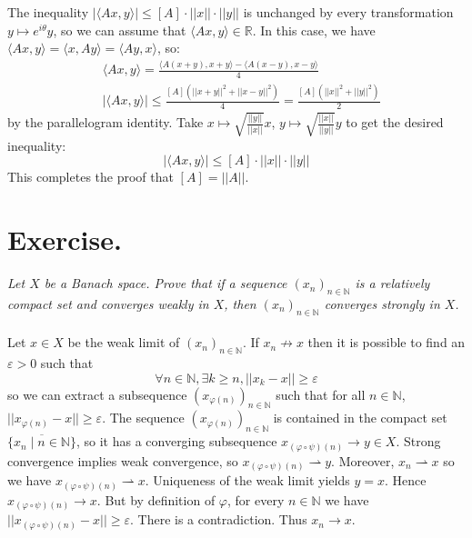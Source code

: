 \documentclass[11pt,a4paper]{article}
\newcommand{\ph}{\varphi}
\newcommand{\il}{\textit}
\newcommand{\N}{\mathbb{N}}
\newcommand{\R}{\mathbb{R}}
\newcommand{\1}{\mathbbm{1}}
\begin{document}
The inequality $|\langle Ax , y \rangle| \leq [A] \cdot ||x|| \cdot ||y||$ is unchanged by every transformation $y \mapsto e^{i\theta} y$, so we can assume that $\langle Ax , y \rangle \in \R$. In this case, we have $\langle Ax , y \rangle = \langle x , Ay \rangle = \langle Ay , x \rangle$, so:
\begin{align*} & \langle Ax , y \rangle = \frac{\langle A(x+y) , x+y \rangle - \langle A(x-y) , x-y \rangle}{4} \\
& |\langle Ax , y \rangle| \leq \frac{[A]\left(||x+y||^2 + ||x-y||^2 \right)}{4} = \frac{[A]\left(||x||^2 + ||y||^2 \right)}{2}
\end{align*}
by the parallelogram identity. Take $x \mapsto \sqrt{\frac{||y||}{||x||}} x$, $y \mapsto \sqrt{\frac{||x||}{||y||}} y$ to get the  desired inequality:
\[ |\langle Ax , y \rangle| \leq [A] \cdot ||x|| \cdot ||y|| \]
This completes the proof that $[A] = ||A||$.
\newpage
\section*{Exercise.}
\il{Let $X$ be a Banach space. Prove that if a sequence $(x_n)_{n\in\N}$ is a relatively compact set and converges weakly in $X$, then $(x_n)_{n\in\N}$ converges strongly in $X$.}\\\\
Let $x \in X$ be the weak limit of $(x_n)_{n\in\N}$. If $x_n \not\to x$ then it is possible to find an $\varepsilon > 0$ such that
\[ \forall n \in \N , \exists k \geq n , ||x_k-x|| \geq \varepsilon \]
so we can extract a subsequence $(x_{\ph(n)})_{n\in\N}$ such that for all $n \in \N$, $||x_{\ph(n)} - x|| \geq \varepsilon$. The sequence $(x_{\ph(n)})_{n\in\N}$ is contained in the compact set $\overline{\{x_n\mid n \in \N\}}$, so it has a converging subsequence $x_{(\ph \circ \psi)(n)}\to y \in X$. Strong convergence implies weak convergence, so $x_{(\ph \circ \psi)(n)} \rightharpoonup y$. Moreover, $x_n \rightharpoonup x$ so we have $x_{(\ph \circ \psi)(n)} \rightharpoonup x$. Uniqueness of the weak limit yields $y = x$. Hence $x_{(\ph \circ \psi)(n)} \to x$. But by definition of $\ph$, for every $n \in \N$ we have $||x_{(\ph\circ\psi)(n)} - x|| \geq \varepsilon$. There is a contradiction. Thus $x_n \to x$.
\end{document}
